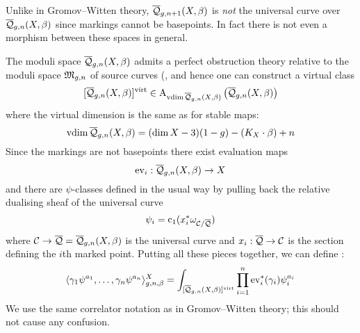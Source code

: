 
\begin{remark} Unlike in Gromov--Witten theory, $\overline{\mathcal Q}_{g,n+1}(X,\beta)$ is \emph{not} the universal curve over $\overline{\mathcal Q}_{g,n}(X,\beta)$ since markings cannot be basepoints. In fact there is not even a morphism between these spaces in general.\end{remark}

The moduli space $\overline{\mathcal Q}_{g,n}(X,\beta)$ admits a perfect obstruction theory relative to the moduli space $\mathfrak M_{g,n}$ of source curves (\cite[\S 5]{CF-K}, and hence one can construct a virtual class
\begin{equation*} [\overline{\mathcal Q}_{g,n}(X,\beta)]^{\operatorname{virt}} \in \operatorname{A}_{\operatorname{vdim}\overline{\mathcal Q}_{g,n}(X,\beta)} \left( \overline{\mathcal Q}_{g,n}(X,\beta) \right) \end{equation*}
where the virtual dimension is the same as for stable maps:
\begin{equation*} \operatorname{vdim}\overline{\mathcal Q}_{g,n}(X,\beta) = (\dim{X} - 3)(1-g) - (K_X \cdot \beta) + n \end{equation*}
Since the markings are not basepoints there exist evaluation maps
\begin{equation*} \operatorname{ev}_i : \overline{\mathcal Q}_{g,n}(X,\beta) \rightarrow X \end{equation*}
and there are $\psi$-classes defined in the usual way by pulling back the relative dualising sheaf of the universal curve
\begin{equation*} \psi_i = \operatorname{c}_1(x_i^* \omega_{\mathcal{C}/\overline{\mathcal{Q}}}) \end{equation*}
where $\mathcal{C} \rightarrow \overline{\mathcal{Q}} = \overline{\mathcal Q}_{g,n}(X,\beta)$ is the universal curve and $x_i : \overline{\mathcal{Q}} \rightarrow \mathcal{C}$ is the section defining the $i$th marked point. Putting all these pieces together, we can define :
\begin{equation*} \langle \gamma_1 \psi^{a_1} , \ldots, \gamma_n \psi^{a_n} \rangle_{g,n,\beta}^X = \int_{[\overline{\mathcal Q}_{g,n}(X,\beta)]^{\operatorname{virt}}} \prod_{i=1}^n \operatorname{ev}_i^* (\gamma_i) \psi_i^{a_i} \end{equation*}
We use the same correlator notation as in Gromov--Witten theory; this should not cause any confusion.

